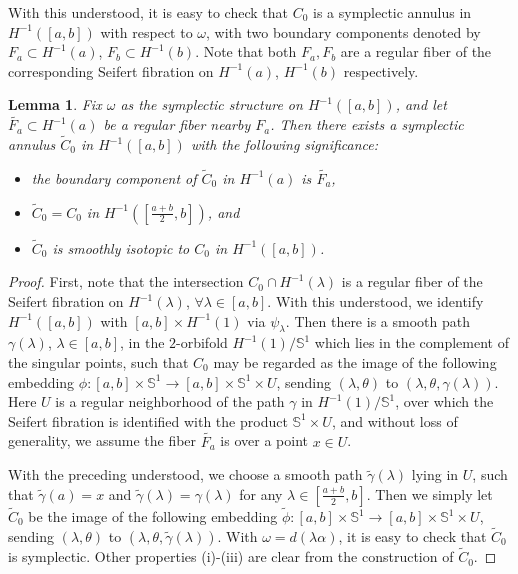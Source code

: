 \documentclass[11pt]{amsart}
\theoremstyle{plain}
\numberwithin{theorem}{section}
\newtheorem{lemma}[theorem]{Lemma}
\theoremstyle{definition}
\newcommand{\s}{{\mathbb S}}
\begin{document}
With this understood, it is easy to check that $C_0$ is a symplectic annulus in $H^{-1}([a,b])$ with respect to 
$\omega$, with two boundary components denoted by $F_a\subset H^{-1}(a)$, $F_b\subset H^{-1}(b)$. Note that both $F_a,F_b$ are a regular fiber of the corresponding Seifert fibration on $H^{-1}(a)$, $H^{-1}(b)$ respectively.

\begin{lemma}
Fix $\omega$ as the symplectic structure on $H^{-1}([a,b])$, and 
let $\tilde{F_a}\subset H^{-1}(a)$ be a regular fiber nearby $F_a$. Then there exists a symplectic 
annulus $\tilde{C}_0$ in $H^{-1}([a,b])$ with the following significance:
\begin{itemize}
\item [{(i)}] the boundary component of $\tilde{C}_0$ in $H^{-1}(a)$ is  $\tilde{F_a}$,
\item [{(ii)}] $\tilde{C}_0=C_0$ in  $H^{-1}([\frac{a+b}{2},b])$, and 
\item [{(iii)}] $\tilde{C}_0$ is smoothly isotopic to $C_0$ in $H^{-1}([a,b])$. 
\end{itemize}
\end{lemma} 

\begin{proof}
First, note that the intersection $C_0\cap H^{-1}(\lambda)$ is a regular fiber of the Seifert fibration on
$H^{-1}(\lambda)$, $\forall \lambda\in [a,b]$. With this understood, we identify  $H^{-1}([a,b])$ with 
$[a,b]\times H^{-1}(1)$ via $\psi_\lambda$. Then there is a smooth path $\gamma(\lambda)$,
$\lambda\in [a,b]$, in the $2$-orbifold $H^{-1}(1)/\s^1$ which lies in the complement of the singular points, such that $C_0$ may be regarded as the image of the following embedding
$\phi: [a,b]\times \s^1\rightarrow [a,b]\times \s^1\times U$, sending $(\lambda,\theta)$ to
$(\lambda,\theta,\gamma(\lambda))$. Here $U$ is a regular neighborhood of the path $\gamma$
in $H^{-1}(1)/\s^1$, over which the Seifert fibration is identified with the product $\s^1\times U$,
and without loss of generality, we assume the fiber $\tilde{F_a}$ is over a point $x\in U$. 

With the preceding understood, we choose a smooth path $\tilde{\gamma}(\lambda)$ lying in $U$,
such that $\tilde{\gamma}(a)=x$ and $\tilde{\gamma}(\lambda)=\gamma(\lambda)$ for any
$\lambda\in [\frac{a+b}{2},b]$. Then we simply let $\tilde{C}_0$ be the image of the following
embedding $\tilde{\phi}: [a,b]\times \s^1\rightarrow [a,b]\times \s^1\times U$, sending 
$(\lambda,\theta)$ to $(\lambda,\theta,\tilde{\gamma}(\lambda))$. With 
$\omega=d(\lambda\alpha)$, it is easy to check that $\tilde{C}_0$ is symplectic. Other
properties (i)-(iii) are clear from the construction of $\tilde{C}_0$.

\end{proof}
\end{document}

